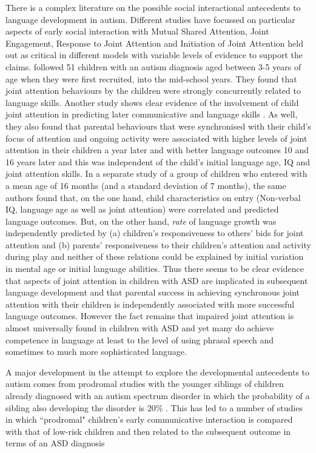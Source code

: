 \documentclass[output=paper]{langsci/langscibook}
\begin{document}
 There is a complex literature on the possible social interactional antecedents to language development in autism.  Different studies have focussed on particular aspects of early social interaction with Mutual Shared Attention, Joint Engagement, Response to Joint Attention and Initiation of Joint Attention held out as critical in different models with variable levels of evidence to support the claims. \citet{Sigman1999} followed 51 children with an autism diagnosis aged between 3-5 years of age when they were first recruited, into the mid-school years.  They found that joint attention behaviours by the children were strongly concurrently related to language skills.   Another study shows clear evidence of the involvement of child joint attention in predicting later communicative and language skills \citep{Siller2002}. As well, they also found that parental behaviours that were synchronised with their child’s focus of attention and ongoing activity  were associated with higher levels of joint attention in their children a year later and with better language outcomes 10 and 16 years later and this was independent of the child’s initial language age, IQ and joint attention skills.   In a separate study of a group of children who entered with a mean age of 16 months (and a standard deviation of 7 months),  the same authors \citep{Siller2008} found that, on the one hand, child characteristics on entry (Non-verbal IQ, language age as well as joint attention) were correlated and predicted language outcomes.  But, on the other hand, \textit{rate} of language growth was independently predicted by (a) children’s responsiveness to others’ bids for joint attention and (b) parents’ responsiveness to their children’s attention and activity during play and neither of these relations could be explained by initial variation in mental age or initial language abilities.  Thus there seems to be clear evidence that aspects of joint attention in children with ASD  are implicated in subsequent language development and that parental success in achieving synchronous joint attention with their children is independently associated with more successful language outcomes.  However the fact remains that impaired joint attention is almost universally found in children with ASD and yet many do achieve competence in language at least to the level of using phrasal speech and sometimes to much more sophisticated language.  

A major development in the attempt to explore the developmental antecedents to autism comes from prodromal studies with the younger siblings of children already diagnosed with an autism spectrum disorder in which the probability of a sibling also developing the disorder is 20\% \citep{Ozonoff2011}.  This has led to a number of studies in which ``prodromal" children’s early communicative interaction is compared with that of low-risk children and then related to the subsequent outcome in terms of an ASD diagnosis \citep{Jones2014,Wan2013,Green2013}
\end{document}
